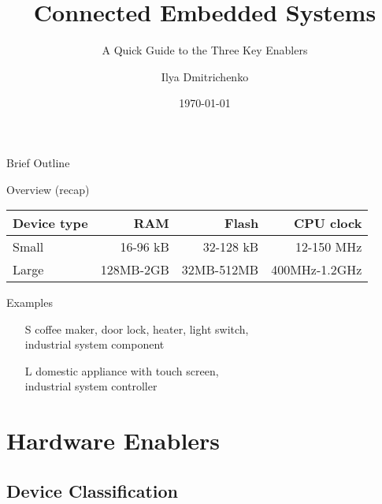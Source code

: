 \documentclass{beamer}
\title{Connected Embedded Systems}
\subtitle{A Quick Guide to the Three Key Enablers}
\author{Ilya Dmitrichenko}
\date{\today}
\begin{document}
\begin{frame}
        \titlepage
\end{frame}

\begin{frame}{Brief Outline}
        \tableofcontents
\end{frame}

\begin{frame}{Overview (recap)}

\begin{table}\centering\begin{tabular}{l|r|r|r}
Device type & RAM & Flash & CPU clock \\\hline
Small & 16-96 kB & 32-128 kB & 12-150 MHz \\
Large & 128MB-2GB & 32MB-512MB & 400MHz-1.2GHz \\
\end{tabular}\end{table}

\vskip 1cm

\begin{block}{Examples}
\begin{itemize}
  \item[S] coffee maker, door lock, heater, light switch,\\ industrial system component
  \item[L] domestic appliance with touch screen,\\ industrial system controller
\end{itemize}
\end{block}

\end{frame}

\section{Hardware Enablers}
\subsection{Device Classification}
\end{document}
